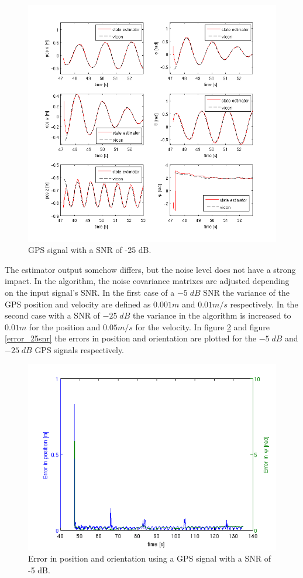 \begin{figure}[hb]
\centering
\includegraphics[width=1\textwidth]{pictures/2_2_SNR25_detail_GPS.png}
\caption{GPS signal with a SNR of -25 dB.}
\label{detail_25snr}
\end{figure}
The estimator output somehow differs, but the noise level does not have a strong impact. In the algorithm, the noise covariance matrixes are adjusted depending on the input signal's SNR. In the first case of a $-5\; dB$ SNR the variance of the GPS position and velocity are defined as $0.001 m$ and $0.01 m/s$ respectively. In the second case with a SNR of $-25\; dB$ the variance in the algorithm is increased to $0.01 m$ for the position and $0.05 m/s$ for the velocity.
In figure \ref{error_5snr} and figure \ref{error_25snr} the errors in position and orientation are plotted for the $-5\; dB$ and $-25\; dB$ GPS signals respectively. 
\begin{figure}[hb]
\centering
\includegraphics[width=1\textwidth]{pictures/2_2_SNR5_errors_GPS.png}
\caption{Error in position and orientation using a GPS signal with a SNR of -5 dB.}
\label{error_5snr}
\end{figure}
